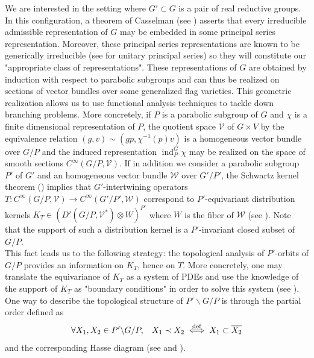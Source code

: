 \documentclass[pdftex]{sigma}
\numberwithin{equation}{section}
\theoremstyle{definition}
\newcommand{\V}{\mathcal{V}}
\newcommand{\W}{\mathcal{W}}
\theoremstyle{plain}
\theoremstyle{plain}
\theoremstyle{plain}
\theoremstyle{plain}
\begin{document}
We are interested in the setting where $G' \subset G$ is a pair of real reductive groups. In this configuration, a theorem of Casselman (see \cite[Theorem 8.37]{Knapp}) asserts that every irreducible admissible representation of $G$ may be embedded in some principal series representation. Moreover, these principal series representations are known to be generically irreducible (see \cite[Theorem 7.2]{bruhat} for unitary principal series) so they will constitute our "appropriate class of representations". These representations of $G$ are obtained by induction with respect to parabolic subgroups and can thus be realized on sections of vector bundles over some generalized flag varieties. This geometric realization allows us to use functional analysis techniques to tackle down branching problems. More concretely, if $P$ is a parabolic subgroup of $G$ and $\chi$ is a finite dimensional representation of $P$, the quotient space $\mathcal V$ of $G \times V$ by the equivalence relation $(g,v) \sim (gp,\chi^{-1}(p)v)$ is a homogeneous vector bundle over $G/P$ and the induced representation $\operatorname{ind}_P^G \chi$ may be realized on the space of smooth sections $C^\infty(G/P,\mathcal V)$. If in addition we consider a parabolic subgroup $P'$ of $G'$ and an homogeneous vector bundle $\mathcal W$ over $G'/P'$, the Schwartz kernel theorem (\cite[Proposition 25]{schwartz}) implies that $G'$-intertwining operators $T : C^\infty(G/P,\V) \to C^\infty(G'/P',\W)$ correspond to $P'$-equivariant distribution kernels $K_T \in (D'(G/P,\V^*) \otimes W)^{P'}$ where $W$ is the fiber of $\W$ (see \cite[Proposition 3.2]{KobayashiSpeh}). Note that the support of such a distribution kernel is a $P'$-invariant closed subset of $G/P$. \\
This fact leads us to the following strategy: the topological analysis of $P'$-orbits of $G/P$ provides an information on $K_T$, hence on $T$. More concretely, one may translate the equivariance of $K_T$ as a system of PDEs and use the knowledge of the support of $K_T$ as "boundary conditions" in order to solve this system (see \cite[Chapter 3]{KobayashiSpeh2}). \\
One way to describe the topological structure of $P'\backslash G/P$ is through the partial order defined as
\begin{equation*}
	\forall X_1,X_2 \in P'\backslash G / P, \hspace{3mm} X_1 \prec X_2 \overset{\mathrm{def}}{\iff} X_1 \subset \overline{X_2}
\end{equation*}
and the corresponding Hasse diagram (see  and ).
\end{document}
